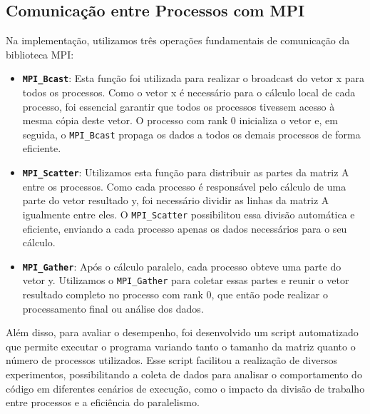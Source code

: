 \documentclass[a4paper, 12pt]{article}
\begin{document}
	\subsection{Comunicação entre Processos com MPI}
	\hspace{0.62cm}Na implementação, utilizamos três operações fundamentais de comunicação da biblioteca MPI:
	\begin{itemize}
		\item \textbf{\texttt{MPI\_Bcast}}: Esta função foi utilizada para realizar o broadcast do vetor x para todos os processos. Como o vetor x é necessário para o cálculo local de cada processo, foi essencial garantir que todos os processos tivessem acesso à mesma cópia deste vetor. O processo com rank 0 inicializa o vetor e, em seguida, o \texttt{MPI\_Bcast} propaga os dados a todos os demais processos de forma eficiente.
		
		\item \textbf{\texttt{MPI\_Scatter}}: Utilizamos esta função para distribuir as partes da matriz A entre os processos. Como cada processo é responsável pelo cálculo de uma parte do vetor resultado y, foi necessário dividir as linhas da matriz A igualmente entre eles. O \texttt{MPI\_Scatter} possibilitou essa divisão automática e eficiente, enviando a cada processo apenas os dados necessários para o seu cálculo.
		
		\item \textbf{\texttt{MPI\_Gather}}: Após o cálculo paralelo, cada processo obteve uma parte do vetor y. Utilizamos o \texttt{MPI\_Gather} para coletar essas partes e reunir o vetor resultado completo no processo com rank 0, que então pode realizar o processamento final ou análise dos dados.
	\end{itemize}
	
	Além disso, para avaliar o desempenho, foi desenvolvido um script automatizado que permite executar o programa variando tanto o tamanho da matriz quanto o número de processos utilizados. Esse script facilitou a realização de diversos experimentos, possibilitando a coleta de dados para analisar o comportamento do código em diferentes cenários de execução, como o impacto da divisão de trabalho entre processos e a eficiência do paralelismo.
	
\end{document}
